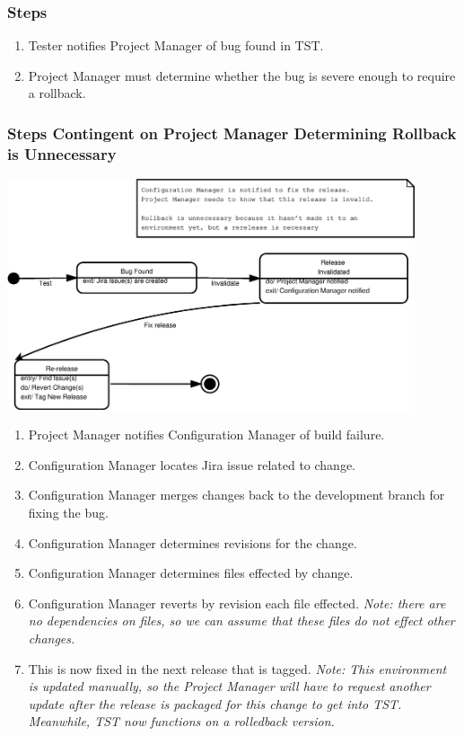 \documentclass[12pt,notitlepage]{article}
\begin{document}
\subsubsection{Steps}
\begin{enumerate}
  \item Tester notifies Project Manager of bug found in TST.
  \item Project Manager must determine whether the bug is severe enough to require a rollback.
\end{enumerate}

\subsubsection{Steps Contingent on Project Manager Determining Rollback is Unnecessary}
\includegraphics[width=12cm]{Diagrams/ChangePromotion_State6.eps}
\begin{enumerate}
  \item Project Manager notifies Configuration Manager of build failure.
  \item Configuration Manager locates Jira issue related to change.
  \item Configuration Manager merges changes back to the development branch for fixing the bug.
  \item Configuration Manager determines revisions for the change.
  \item Configuration Manager determines files effected by change.
  \item Configuration Manager reverts by revision each file effected. \emph{Note: there are no dependencies
    on files, so we can assume that these files do not effect other changes. }
  \item This is now fixed in the next release that is tagged. \emph{Note: This environment 
  is updated manually, so the Project Manager will have to request another update after the release
  is packaged for this change to get into TST. Meanwhile, TST now functions on a rolledback version.}  
\end{enumerate}
\end{document}
